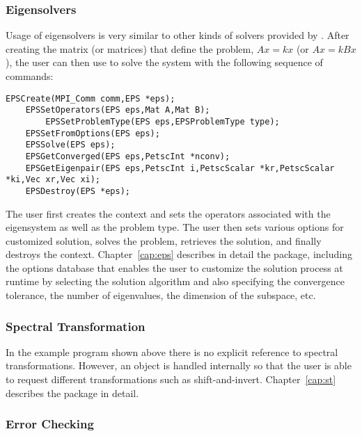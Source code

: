 \subsubsection*{Eigensolvers}

Usage of eigensolvers is very similar to other kinds of solvers provided by \petsc. After creating the matrix (or matrices) that define the problem, $Ax = kx$ (or $Ax=kBx$), the user can then use  to solve the system with the following sequence of commands: 
  
  
 
	\begin{Verbatim}[fontsize=\small,numbers=none]
	EPSCreate(MPI_Comm comm,EPS *eps);
	EPSSetOperators(EPS eps,Mat A,Mat B);
        EPSSetProblemType(EPS eps,EPSProblemType type);
	EPSSetFromOptions(EPS eps);
	EPSSolve(EPS eps);
	EPSGetConverged(EPS eps,PetscInt *nconv);
	EPSGetEigenpair(EPS eps,PetscInt i,PetscScalar *kr,PetscScalar *ki,Vec xr,Vec xi);
	EPSDestroy(EPS *eps);
	\end{Verbatim} 
The user first creates the  context and sets the operators associated with the eigensystem as well as the problem type. The user then sets various options for customized solution, solves the problem, retrieves the solution, and finally destroys the  context. Chapter~\ref{cap:eps} describes in detail the  package, including
the options database that enables the user to customize the solution process at runtime by selecting the solution algorithm and also specifying the convergence tolerance, the number of eigenvalues, the dimension of the subspace, etc.

\subsubsection*{Spectral Transformation}

In the example program shown above there is no explicit reference to spectral transformations. However, an  object is handled internally so that the user is able to request different transformations such as shift-and-invert. Chapter~\ref{cap:st} describes the  package in detail.

\subsubsection*{Error Checking}

